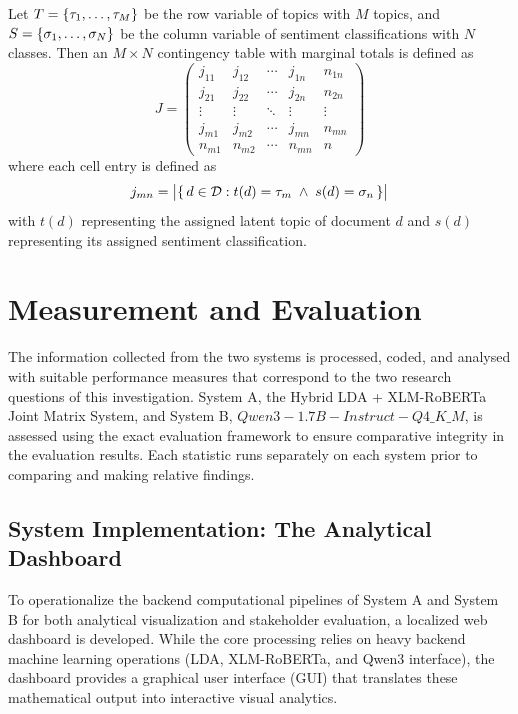 Let $T = \{\tau_{1}, \dots, \tau_{M}\}$ be the row variable of topics
with $M$ topics, and $S = \{\sigma_{1}, \dots, \sigma_{N}\}$ be the column variable
of sentiment classifications with $N$ classes. Then an $M \times N$ contingency
table with marginal totals is defined as
\begin{equation}
	J =
	\begin{pmatrix}
		j_{11}   & j_{12}   & \cdots & j_{1n}   & n_{1n} \\
		j_{21}   & j_{22}   & \cdots & j_{2n}   & n_{2n} \\
		\vdots   & \vdots   & \ddots & \vdots   & \vdots \\
		j_{m1}   & j_{m2}   & \cdots & j_{mn}   & n_{mn} \\
		n_{m1}      & n_{m2}      & \cdots & n_{mn}      & n
	\end{pmatrix}
	\label{eq:jointmatrix}
\end{equation}
where each cell entry is defined as
\begin{equation}
	j_{mn} = \bigl|\{\, d \in \mathcal{D} : t(d) = \tau_{m} \;\wedge\; s(d) = \sigma_{n} \,\}\bigr|
	\label{eq:cellentry}
\end{equation}
with $t(d)$ representing the assigned latent topic of document $d$ and $s(d)$
representing its assigned sentiment classification.

\section*{Measurement and Evaluation}

The information collected from the two systems is processed, coded, and
analysed with suitable performance measures that correspond to the two
research questions of this investigation. System A, the Hybrid LDA + XLM-RoBERTa Joint
Matrix System, and System B, $Qwen3-1.7B-Instruct-Q4\_K\_M$, is assessed using the exact evaluation
framework to ensure comparative integrity in the evaluation results. Each
statistic runs separately on each system prior to comparing and making
relative findings.

\subsection*{System Implementation: The Analytical Dashboard}

To operationalize the backend computational pipelines of System A and System B for both analytical visualization
and stakeholder evaluation, a localized web dashboard is developed. While the core processing relies on heavy backend machine learning operations (LDA, XLM-RoBERTa, and Qwen3 interface), the dashboard provides a graphical user interface (GUI) that translates these mathematical output into interactive visual analytics.

